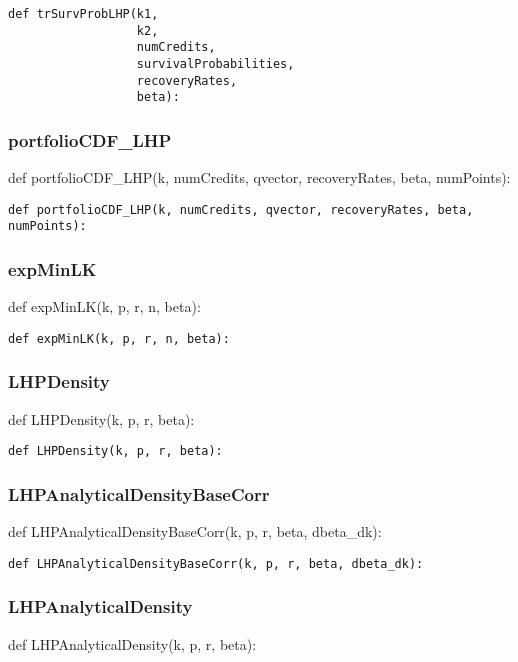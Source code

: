 \documentclass[twoside,11pt]{book}
\begin{document}
\begin{lstlisting}
def trSurvProbLHP(k1,
                  k2,
                  numCredits,
                  survivalProbabilities,
                  recoveryRates,
                  beta):
\end{lstlisting}

\subsubsection*{{\bf portfolioCDF\_LHP}}
def portfolioCDF\_LHP(k, numCredits, qvector, recoveryRates, beta, numPoints): 

\begin{lstlisting}
def portfolioCDF_LHP(k, numCredits, qvector, recoveryRates, beta, numPoints):
\end{lstlisting}

\subsubsection*{{\bf expMinLK}}
def expMinLK(k, p, r, n, beta): 

\begin{lstlisting}
def expMinLK(k, p, r, n, beta):
\end{lstlisting}

\subsubsection*{{\bf LHPDensity}}
def LHPDensity(k, p, r, beta): 

\begin{lstlisting}
def LHPDensity(k, p, r, beta):
\end{lstlisting}

\subsubsection*{{\bf LHPAnalyticalDensityBaseCorr}}
def LHPAnalyticalDensityBaseCorr(k, p, r, beta, dbeta\_dk): 

\begin{lstlisting}
def LHPAnalyticalDensityBaseCorr(k, p, r, beta, dbeta_dk):
\end{lstlisting}

\subsubsection*{{\bf LHPAnalyticalDensity}}
def LHPAnalyticalDensity(k, p, r, beta): 
\end{document}
